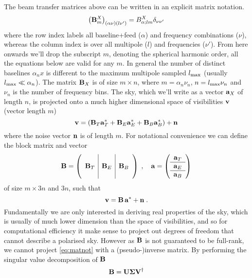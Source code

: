 \documentclass[onecolumn]{revtex4}
\begin{document}
The beam transfer matrices above can be written in an explicit matrix notation.
\begin{equation}
\left(\mathbf{B}_m^X\right)_{(\alpha \nu) (l \nu')} = B_{\alpha;lm}^X \delta_{\nu \nu'}
\end{equation}
where the row index labels all baseline+feed ($\alpha$) and frequency
combinations ($\nu$), whereas the column index is over all multipole ($l$) and
frequencies ($\nu'$). From here onwards we'll drop the subscript $m$, denoting
the spherical harmonic order, all the equations below are valid for any $m$. In
general the number of distinct baselines $\alpha_nx$ is different to the maximum
multipole sampled $l_{\text{max}}$ (usually $l_{\text{max}} \ll \alpha_n$). The matrix
$\mathbf{B}_X$ is of size $m \times n$, where $m = \alpha_n \nu_n$, $n = l_{\text{max}}
\nu_n$ and $\nu_n$ is the number of frequency bins. The sky, which we'll write
as a vector $\mathbf{a}_X$ of length $n$, is projected onto a much higher dimensional
space of visibilities $\mathbf{v}$ (vector length $m$)
\begin{equation}
\mathbf{v} = \left(\mathbf{B}_T \mathbf{a}_T^* + \mathbf{B}_E \mathbf{a}_E^* + \mathbf{B}_B \mathbf{a}_B^* \right) + \mathbf{n}
\end{equation}
where the noise vector $\mathbf{n}$ is of length $m$. For notational convenience we can
define the block matrix and vector
\begin{equation}
\mathbf{B} = \left(\begin{array}{c|c|c} & & \\ \mathbf{B}_T & \mathbf{B}_E & \mathbf{B}_B \\ &
    &\end{array}\right)
\;, \quad
\mathbf{a} = \left(\begin{array}{c} \mathbf{a}_T \\ \hline \mathbf{a}_E \\ \hline
    \mathbf{a}_B\end{array}\right)
\end{equation}
of size $m \times 3 n$ and $3 n$, such that
\begin{equation}
\label{eq:matnot}
\mathbf{v} = \mathbf{B}\, \mathbf{a}^* + \mathbf{n} \; .
\end{equation}
Fundamentally we are only interested in deriving real properties of the sky,
which is usually of much lower dimension than the space of visibilities, and so
for computational efficiency it make sense to project out degrees of freedom
that cannot describe a polarised sky. However as $\mathbf{B}$ is not guaranteed to be
full-rank, we cannot project \eqref{eq:matnot} with a (pseudo-)inverse
matrix. By performing the singular value decomposition of $\mathbf{B}$
\begin{equation}
\mathbf{B} = \mathbf{U} \mathbf{\Sigma} \mathbf{V}^\dagger
\end{equation}
\end{document}
